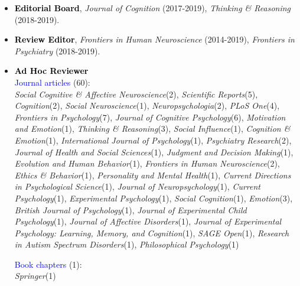 \documentclass[10pt]{article}
\begin{document}
	
	\begin{itemize}
	
	\item \textcolor{black}{{\textbf{Editorial Board}}}, \textit{Journal of Cognition} (2017-2019), \textit{Thinking \& Reasoning} (2018-2019).
	
	
	\item \textcolor{black}{{\textbf{Review Editor}}}, \textit{Frontiers in Human Neuroscience} (2014-2019), \textit{Frontiers in Psychiatry} (2018-2019).
	
	
	\item \textcolor{black}{{\textbf{Ad Hoc Reviewer}}}\\
	\textcolor{blue}{{Journal articles}} (60):\\
	\textit{Social Cognitive \& Affective Neuroscience}(2), \textit{Scientific Reports}(5), \textit{Cognition}(2), \textit{Social Neuroscience}(1), 
	\textit{Neuropsychologia}(2), \textit{PLoS One}(4), \textit{Frontiers in Psychology}(7), \textit{Journal of Cognitive Psychology}(6), 
	\textit{Motivation and Emotion}(1), \textit{Thinking \& Reasoning}(3), \textit{Social Influence}(1), \textit{Cognition \& Emotion}(1),
	\textit{International Journal of Psychology}(1),  \textit{Psychiatry Research}(2),
	\textit{Journal of Health and Social Sciences}(1),
	\textit{Judgment and Decision Making}(1), \textit{Evolution and Human Behavior}(1),   \textit{Frontiers in Human Neuroscience}(2), 
	\textit{Ethics \& Behavior}(1), \textit{Personality and Mental Health}(1),  \textit{Current Directions in Psychological Science}(1),
	\textit{Journal of Neuropsychology}(1), \textit{Current Psychology}(1), \textit{Experimental Psychology}(1), \textit{Social Cognition}(1), 
	\textit{Emotion}(3), \textit{British Journal of Psychology}(1), \textit{Journal of Experimental Child Psychology}(1), \textit{Journal of Affective Disorders}(1), \textit{Journal of Experimental Psychology: Learning, Memory, and Cognition}(1), \textit{SAGE Open}(1), \textit{Research in Autism Spectrum Disorders}(1), \textit{Philosophical Psychology}(1)  
	
	\textcolor{blue}{Book chapters} (1):\\
	\textit{Springer}(1)
	
	\end{itemize}
	
	
\end{document}
